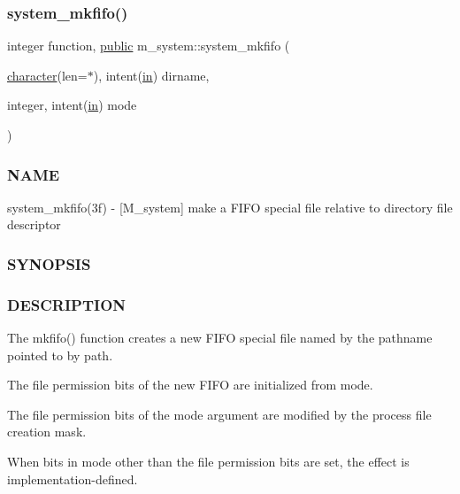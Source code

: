\mbox{\label{namespacem__system_aaa02751b5065c8fd046a56cbbd1a0e1e}} 
\subsubsection{\texorpdfstring{system\+\_\+mkfifo()}{system\_mkfifo()}}
{\footnotesize\ttfamily integer function, \hyperlink{M__stopwatch_83_8txt_a2f74811300c361e53b430611a7d1769f}{public} m\+\_\+system\+::system\+\_\+mkfifo (\begin{DoxyParamCaption}\item[{\hyperlink{option__stopwatch_83_8txt_abd4b21fbbd175834027b5224bfe97e66}{character}(len=$\ast$), intent(\hyperlink{M__journal_83_8txt_afce72651d1eed785a2132bee863b2f38}{in})}]{dirname,  }\item[{integer, intent(\hyperlink{M__journal_83_8txt_afce72651d1eed785a2132bee863b2f38}{in})}]{mode }\end{DoxyParamCaption})}



\subsubsection*{N\+A\+ME}

system\+\_\+mkfifo(3f) -\/ \mbox{[}M\+\_\+system\mbox{]} make a F\+I\+FO special file relative to directory file descriptor \subsubsection*{S\+Y\+N\+O\+P\+S\+IS}

\subsubsection*{D\+E\+S\+C\+R\+I\+P\+T\+I\+ON}

The mkfifo() function creates a new F\+I\+FO special file named by the pathname pointed to by path.

The file permission bits of the new F\+I\+FO are initialized from mode.

The file permission bits of the mode argument are modified by the process\textquotesingle{} file creation mask.

When bits in mode other than the file permission bits are set, the effect is implementation-\/defined.

